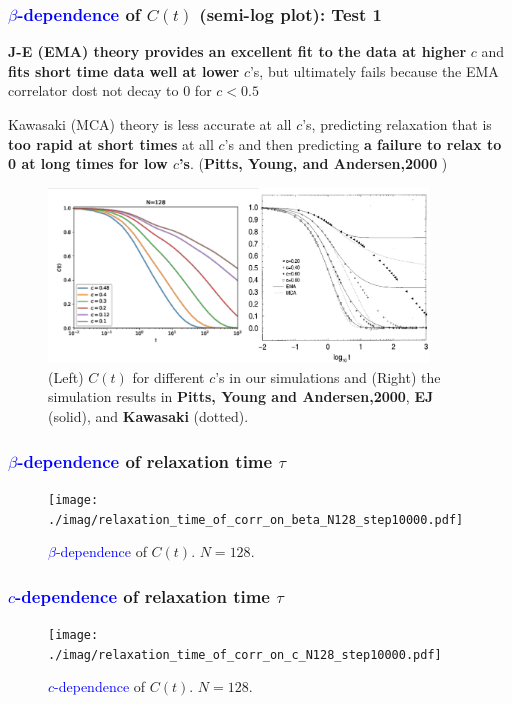 \documentclass[8pt]{beamer}
\begin{document}
\begin{frame}
	\frametitle{{\textcolor{blue}{$\beta$-dependence}} of $C(t)$ (semi-log plot): Test 1}
	\textbf{J-E (EMA) theory provides an excellent fit to the data at higher} $c$ and \textbf{fits short time data well at lower} $c$'s, but ultimately fails because the EMA correlator dost not decay to 0 for $c<0.5$
	
	Kawasaki (MCA) theory is less accurate at all $c$'s, predicting relaxation that is \textbf{too rapid at short times} at all $c$'s and then predicting \textbf{a failure to relax to 0 at long times for low $c$'s}. (\textbf{Pitts, Young, and Andersen,2000} )     
	\begin{figure}
		\centering
		\includegraphics [width=0.9\textwidth] {./imag/beta_dependence_of_corr_N128_step10000_b.pdf}
		\setlength{\abovecaptionskip}{0pt}
		\caption{ (Left) $C(t)$ for different $c$'s in our simulations and (Right) the simulation results in \textbf{Pitts, Young and Andersen,2000}, \textbf{EJ} (solid), and \textbf{Kawasaki} (dotted). }
	\end{figure}
\end{frame}

\begin{frame}
	\frametitle{{\textcolor{blue}{$\beta$-dependence}} of relaxation time $\tau$}
	\begin{figure}
		\centering
		\texttt{[image: ./imag/relaxation\_time\_of\_corr\_on\_beta\_N128\_step10000.pdf]}
		\setlength{\abovecaptionskip}{0pt}
		\caption{{\textcolor{blue}{$\beta$-dependence}} of $C(t)$. $N=128$.}
	\end{figure}
\end{frame}

\begin{frame}
	\frametitle{{\textcolor{blue}{$c$-dependence}} of relaxation time $\tau$}
	\begin{figure}
		\centering
		\texttt{[image: ./imag/relaxation\_time\_of\_corr\_on\_c\_N128\_step10000.pdf]}
		\setlength{\abovecaptionskip}{0pt}
		\caption{{\textcolor{blue}{$c$-dependence}} of $C(t)$. $N=128$.}
	\end{figure}
\end{frame}
\end{document}
